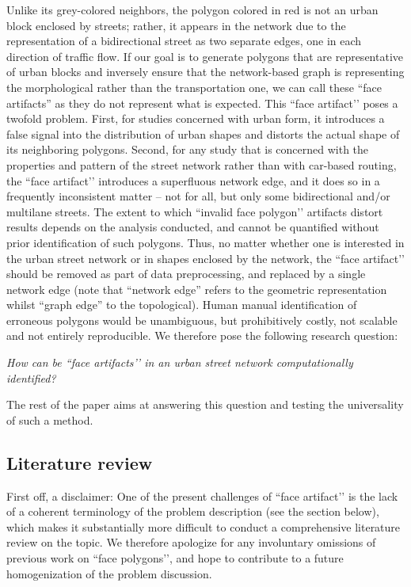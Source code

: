 Unlike its grey-colored neighbors, the polygon colored in red is not an urban block
enclosed by streets; rather, it appears in the network due to the representation of a
bidirectional street as two separate edges, one in each direction of traffic flow. If
our goal is to generate  polygons that are representative of urban blocks and inversely
ensure that the network-based graph is representing the morphological rather than the
transportation one, we can call these ``face artifacts'' as they do not represent
what is expected. This ``face artifact’’ poses a twofold problem. First, for
studies concerned with urban form, it introduces a false signal into the distribution of
urban shapes and distorts the actual shape of its neighboring polygons. Second, for any
study that is concerned with the properties and pattern of the street network rather
than with car-based routing, the ``face artifact’’ introduces a superfluous
network edge, and it does so in a frequently inconsistent matter – not for all, but only
some bidirectional and/or multilane streets. The extent to which ``invalid face
polygon’’ artifacts distort results depends on the analysis conducted, and cannot be
quantified without prior identification of such polygons. Thus, no matter whether one is
interested in the urban street network or in shapes enclosed by the network, the
``face artifact’’ should be removed as part of data preprocessing, and replaced
by a single network edge (note that ``network edge'' refers to the geometric
representation whilst ``graph edge'' to the topological). Human manual identification of
erroneous polygons would be unambiguous, but prohibitively costly, not scalable and not
entirely reproducible. We therefore pose the following research question:

\begin{center}
\textit{How can be ``face artifacts’’ in an urban street network computationally identified?}
\end{center}

The rest of the paper aims at answering this question and testing the universality of such
a method.

\subsection*{Literature review}

First off, a disclaimer: One of the present challenges of ``face artifact’’ is the lack of a
coherent terminology of the problem description (see the section below), which makes it
substantially more difficult to conduct a comprehensive literature review on the topic.
We therefore apologize for any involuntary omissions of previous work on ``face polygons’’,
and hope to contribute to a future homogenization of the problem discussion.

